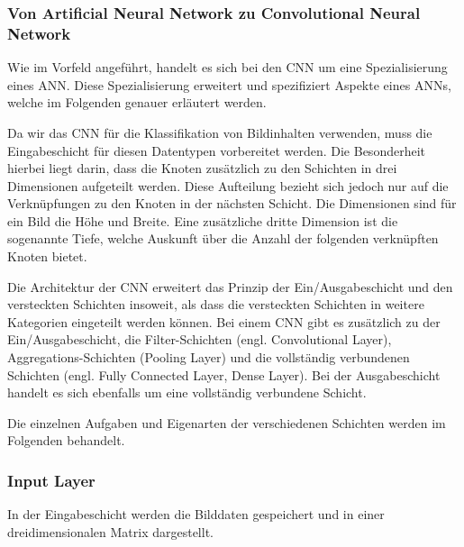 \subsubsection*{Von Artificial Neural Network zu Convolutional Neural Network}
Wie im Vorfeld angeführt, handelt es sich bei den CNN um eine Spezialisierung eines ANN. Diese Spezialisierung erweitert und spezifiziert Aspekte eines ANNs, welche im Folgenden genauer erläutert werden.

Da wir das CNN für die Klassifikation von Bildinhalten verwenden, muss die Eingabeschicht für diesen Datentypen vorbereitet werden. Die Besonderheit hierbei liegt darin, dass die Knoten zusätzlich zu den Schichten in drei Dimensionen aufgeteilt werden. Diese Aufteilung bezieht sich jedoch nur auf die Verknüpfungen zu den Knoten in der nächsten Schicht. Die Dimensionen sind für ein Bild die Höhe und Breite. Eine zusätzliche dritte Dimension ist die sogenannte Tiefe, welche Auskunft über die Anzahl der folgenden verknüpften Knoten bietet.

Die Architektur der CNN erweitert das Prinzip der Ein/Ausgabeschicht und den versteckten Schichten insoweit, als dass die versteckten Schichten in weitere Kategorien eingeteilt werden können. Bei einem CNN gibt es zusätzlich zu der Ein/Ausgabeschicht, die Filter-Schichten (engl. Convolutional Layer), Aggregations-Schichten (Pooling Layer) und die vollständig verbundenen Schichten (engl. Fully Connected Layer, Dense Layer).
Bei der Ausgabeschicht handelt es sich ebenfalls um eine vollständig verbundene Schicht. \cite*{Keiron2015}

Die einzelnen Aufgaben und Eigenarten der verschiedenen Schichten werden im Folgenden behandelt.

\subsubsection{Input Layer}
In der Eingabeschicht werden die Bilddaten gespeichert und in einer dreidimensionalen Matrix dargestellt.\cite*{Sewak2018}

